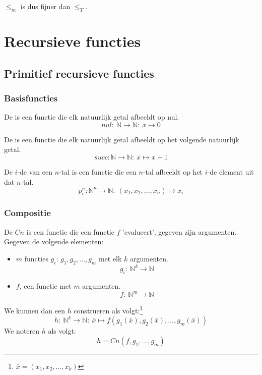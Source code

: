 \documentclass[main.tex]{subfiles}
\begin{document}
\begin{gev}
  $\le_{m}$ is dus fijner dan $\le_{T}$.
\end{gev}

\section{Recursieve functies}
\label{sec:recursieve-functies}

\subsection{Primitief recursieve functies}
\label{sec:prim-recurs-funct}

\subsubsection{Basisfuncties}
\label{sec:basisfuncties}

\begin{de}
  De  is een functie die elk natuurlijk getal afbeeldt op nul.
  \[ nul:\ \mathbb{N} \rightarrow \mathbb{N}:\ x \mapsto 0 \]
\end{de}

\begin{de}
  De  is een functie die elk natuurlijk getal afbeeldt op het volgende natuurlijk getal.
  \[ succ: \mathbb{N} \rightarrow \mathbb{N}:\ x \mapsto x+1 \]
\end{de}

\begin{de}
  De $i$-de  van een $n$-tal is een functie die een $n$-tal afbeeldt op het $i$-de element uit dat $n$-tal.
  \[ p_{i}^{n}: \mathbb{N}^{n} \rightarrow \mathbb{N}:\ (x_{1},x_{2}, \dotsc, x_{n}) \mapsto x_{i} \]
\end{de}

\subsubsection{Compositie}
\label{sec:compositie}

\begin{de}
  De  $Cn$ is een functie die een functie $f$ 'evalueert', gegeven zijn argumenten.
  Gegeven de volgende elementen:
  \begin{itemize}
  \item 
    $m$ functies $g_{i}$: $g_{1},g_{2},\dotsc,g_{m}$ met elk $k$ argumenten.
    \[ g_{i}:\ \mathbb{N}^{k} \rightarrow \mathbb{N} \]
  \item 
    $f$, een functie met $m$ argumenten.
    \[ f:\ \mathbb{N}^{m} \rightarrow \mathbb{N} \]
  \end{itemize}
  We kunnen dan een $h$ construeren als volgt:\footnote{$\bar{x} = (x_{1},x_{2},\dotsc,x_{k})$}
  \[ h:\ \mathbb{N}^{k} \rightarrow \mathbb{N}:\ \bar{x} \mapsto f(g_{1}(\bar{x}),g_{2}(\bar{x}),\dotsc,g_{m}(\bar{x})) \]
  We noteren $h$ als volgt:
  \[ h = Cn(f,g_{1},\dotsc,g_{m}) \]
\end{de}
\end{document}
